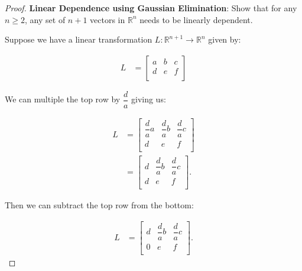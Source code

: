 \documentclass[12pt]{article}
\begin{document}

\begin{proof}
\textbf{Linear Dependence using Gaussian Elimination}: Show that for any \(n \geq 2\), any set of $n+1$ vectors in \(\mathbb{R}^n\) needs to be linearly dependent.

\bigskip
\noindent
Suppose we have a linear transformation \(L:\mathbb{R}^{n+1} \rightarrow \mathbb{R}^n\) given by:

\begin{equation}
\begin{split}
L&=
\begin{bmatrix}
    a & b & c \\
    d & e & f \\
\end{bmatrix}
\end{split}
\end{equation}

\noindent
We can multiple the top row by \(\dfrac{d}{a}\) giving us:

\begin{equation}
\begin{split}
L &= 
\begin{bmatrix}
    \dfrac{d}{a}a & \dfrac{d}{a}b & \dfrac{d}{a}c \\
    d & e & f \\
\end{bmatrix} \\
& = 
\begin{bmatrix}
    d & \dfrac{d}{a}b & \dfrac{d}{a}c \\
    d & e & f \\
\end{bmatrix}. 
\end{split}
\end{equation}

\noindent
Then we can subtract the top row from the bottom:

\begin{equation}
\begin{split}
L & = 
\begin{bmatrix}
    d & \dfrac{d}{a}b & \dfrac{d}{a}c \\
    0 & e & f \\
\end{bmatrix}.
\end{split}
\end{equation}


\end{proof}
\end{document}
